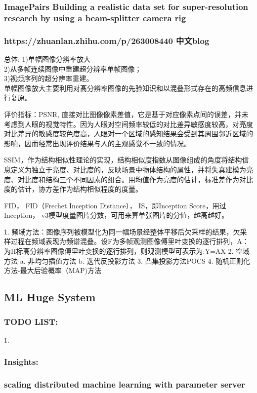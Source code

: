 \documentclass[UTF8]{article}
\begin{document}
\subsubsection{ImagePairs Building a realistic data set for super-resolution research by using a beam-splitter camera rig}
\subsubsection{https://zhuanlan.zhihu.com/p/263008440 中文blog}
总体:
1)单幅图像分辨率放大 \\
2)从多帧连续图像中重建超分辨率单帧图像；\\
3)视频序列的超分辨率重建。 \\

单幅图像放大主要利用对髙分辨率图像的先验知识和以混叠形式存在的高频信息进行复原。

评价指标：PSNR, 直接对比图像像素差值，它是基于对应像素点间的误差，并未考虑到人眼的视觉特性。因为人眼对空间频率较低的对比差异敏感度较高，对亮度对比差异的敏感度较色度高，人眼对一个区域的感知结果会受到其周围邻近区域的影响，因而经常出现评价结果与人的主观感觉不一致的情况。

SSIM，作为结构相似性理论的实现，结构相似度指数从图像组成的角度将结构信息定义为独立于亮度、对比度的，反映场景中物体结构的属性，并将失真建模为亮度、对比度和结构三个不同因素的组合。用均值作为亮度的估计，标准差作为对比度的估计，协方差作为结构相似程度的度量。

FID， FID（Frechet Inception Distance）， IS，即Inception Score，用过Inception， v3模型度量图片分数，可用来算单张图片的分值，越高越好。

1. 频域方法：图像序列被模型化为同一幅场景经整体平移后欠采样的结果，欠采样过程在频域表现为频谱混叠。设F为多帧观测图像傅里叶变换的逐行排列，A：为H标高分辨率图像傅里叶变换的逐行排列，则观测模型可表示为:Y=AX
2. 空域方法
a. 非均匀插值方法
b. 迭代反投影方法
3. 凸集投影方法POCS
4. 随机正则化方法-最大后验概率（MAP)方法

\subsection{ML Huge System}
\subsubsection{TODO LIST:}
1.
\subsubsection{Insights:}
\subsubsection{scaling distributed machine learning with parameter server}
\end{document}
